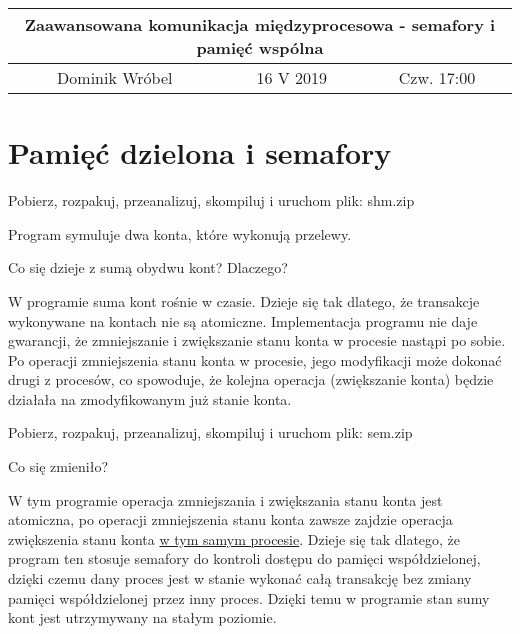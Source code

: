 \documentclass[a4paper,15pt]{article}
\newcommand{\ask}[2]{
    \begin{tcolorbox}[colback=black!5!white,colframe=gray,title={Pytanie #1}]
        #2
    \end{tcolorbox}
}
\begin{document}
\begin{table}
\begin{center}
\begin{tabular}{|c|c|c|}
\hline
\multicolumn{3}{|c|}{\textbf{Zaawansowana komunikacja międzyprocesowa - semafory i pamięć wspólna}} \\ \hline Dominik Wróbel & 16 V 2019 & Czw. 17:00 \\ \hline

\end{tabular}
\end{center}
\end{table}

\tableofcontents

\newpage
\section{Pamięć dzielona i semafory}



\ask{1}{ Pobierz, rozpakuj, przeanalizuj, skompiluj i uruchom plik: shm.zip

Program symuluje dwa konta, które wykonują przelewy.

Co się dzieje z sumą obydwu kont? Dlaczego? }

W programie suma kont rośnie w czasie. Dzieje się tak dlatego, że transakcje wykonywane na kontach nie są atomiczne. Implementacja programu nie daje gwarancji, że zmniejszanie i zwiększanie stanu konta w procesie nastąpi po sobie. Po operacji zmniejszenia stanu konta w procesie, jego modyfikacji może dokonać drugi z procesów, co spowoduje, że kolejna operacja (zwiększanie konta) będzie działała na zmodyfikowanym już stanie konta. 

\ask{2}{  Pobierz, rozpakuj, przeanalizuj, skompiluj i uruchom plik: sem.zip

Co się zmieniło?  }

W tym programie operacja zmniejszania i zwiększania stanu konta jest atomiczna, po operacji zmniejszenia stanu konta zawsze zajdzie operacja zwiększenia stanu konta \underline{w tym samym procesie}. Dzieje się tak dlatego, że program ten stosuje semafory do kontroli dostępu do pamięci współdzielonej, dzięki czemu dany proces jest w stanie wykonać całą transakcję bez zmiany pamięci współdzielonej przez inny proces. Dzięki temu w programie stan sumy kont jest utrzymywany na stałym poziomie.


\end{document}
